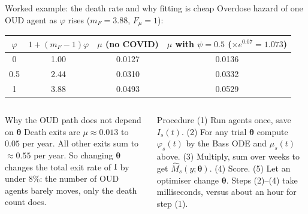 ﻿\documentclass[9pt,aspectratio=169]{beamer}
\begin{document}
\begin{frame}{Worked example: the death rate and why fitting is cheap}
 Overdose hazard of one OUD agent as $\varphi$ rises ($m_F=3.88$, $F_\mu=1$):
 \par\smallskip
 \centering\small\renewcommand{\arraystretch}{1.2}
 \begin{tabular}{c c c c}
 \toprule $\varphi$ & $1+(m_F-1)\varphi$ & $\mu$ (no COVID) & $\mu$ with $\psi=0.5$ ($\times e^{0.07}=1.073$)\\\midrule
 0 & 1.00 & 0.0127 & 0.0136\\
 0.5 & 2.44 & 0.0310 & 0.0332\\
 1 & 3.88 & 0.0493 & 0.0529\\\bottomrule
 \end{tabular}
 \par\smallskip\raggedright
 \begin{columns}[T]
 \begin{block}{Why the OUD path does not depend on $\bm\theta$}\small
  Death exits are $\mu\approx0.013$ to $0.05$ per year. All other exits sum to $\approx0.55$ per year. So changing $\bm\theta$ changes the total exit rate of $\mathrm{I}$ by under $8\%$: the number of OUD agents barely moves, only the death count does.
 \end{block}
 \begin{block}{Procedure}\small
  (1) Run agents once, save $I_s(t)$. (2) For any trial $\bm\theta$ compute $\varphi_s(t)$ by the Bass ODE and $\mu_s(t)$ above. (3) Multiply, sum over weeks to get $\widehat M_s(y;\bm\theta)$. (4) Score. (5) Let an optimiser change $\bm\theta$. Steps (2)--(4) take milliseconds, versus about an hour for step (1).
 \end{block}
 \end{columns}
\end{frame}
\end{document}
